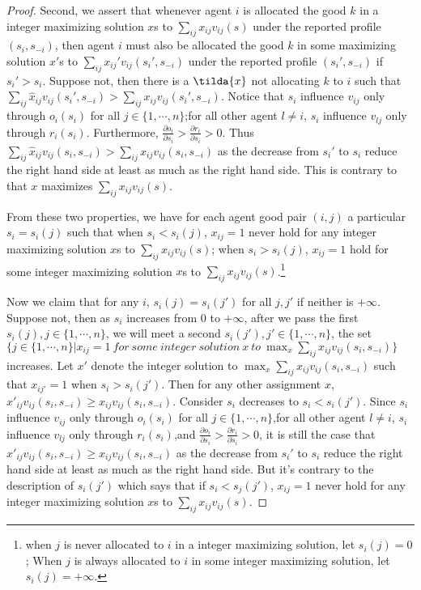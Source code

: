 \begin{proof}
 Second, we assert that whenever agent $i$ is allocated the good $k$ in a integer maximizing solution $x$s to  $\sum_{ij}x_{ij}v_{ij}(s)$ under the reported profile $(s_i,s_{-i})$, then agent $i$ must also be allocated the good $k$ in some maximizing solution $x'$s to  $\sum_{ij}x_{ij}'v_{ij}(s_i', s_{-i})$ under the reported profile $(s_i',s_{-i})$ if $s_i' > s_i$. Suppose not, then there is a $\tilda{x}$ not allocating $k$ to $i$ such that $\sum_{ij}\hat{x}_{ij}v_{ij}(s_i', s_{-i}) > \sum_{ij}x_{ij}v_{ij}(s_i',s_{-i})$. Notice that $s_i$ influence $v_{ij}$ only through $o_i(s_i)$ for all $j \in \{1,\cdots,n\}$;for all other agent $l \not = i$, $s_i$ influence $v_{lj}$ only through $r_i(s_i)$. Furthermore, $\frac{\partial o_i}{\partial s_i}> \frac{\partial r_i}{\partial s_i} > 0$. Thus $\sum_{ij}\hat{x}_{ij}v_{ij}(s_i, s_{-i}) > \sum_{ij}x_{ij}v_{ij}(s_i,s_{-i})$ as the decrease from $s_i'$ to $s_i$ reduce the right hand side at least as much as the right hand side. This is contrary to  that $x$ maximizes $\sum_{ij}x_{ij}v_{ij}(s)$.
 
 From these two properties, we have for each agent good pair $(i,j)$ a particular $s_i=s_i(j)$ such that when $s_i < s_i(j)$, $x_{ij}=1$ never hold for any integer maximizing solution $x$s to  $\sum_{ij}x_{ij}v_{ij}(s)$; when $s_i > s_i(j)$, $x_{ij}=1$ hold for some integer maximizing solution $x$s to  $\sum_{ij}x_{ij}v_{ij}(s)$.\footnote{when $j$ is never allocated to $i$ in a integer maximizing solution, let $s_i(j)=0$; When $j$ is always allocated to $i$ in some integer maximizing solution, let $s_i(j)=+\infty$.}

 Now we claim that for any $i$, $s_i(j)=s_i(j')$ for all $j, j'$ if neither is $+\infty$. Suppose not, then as $s_i$ increases from $0$ to $+\infty$, after we pass the first
 $s_i(j),j \in \{1,\cdots,n\}$, we will meet a second $s_i(j'), j' \in \{1,\cdots,n\}$, the set $\{j \in  \{1,\cdots,n\}| x_{ij}=1\ for\ some\ integer\ solution\ x\ to\ \max_x\sum_{ij}x_{ij}v_{ij}(s_i,s_{-i})\}$ increases. Let $x'$ denote the integer solution to $\max_x\sum_{ij}x_{ij}v_{ij}(s_i,s_{-i})$
 such that $x_{ij'}=1$ when $s_i > s_i(j')$. Then for any other assignment $x$, $x'_{ij}v_{ij}(s_i,s_{-i}) \geq x_{ij}v_{ij}(s_i,s_{-i})$. Consider $s_i$ decreases to  $s_i < s_i(j')$. Since  $s_i$ influence $v_{ij}$ only through $o_i(s_i)$ for all $j \in \{1,\cdots,n\}$,for all other agent $l \not = i$, $s_i$ influence $v_{lj}$ only through $r_i(s_i)$,and $\frac{\partial o_i}{\partial s_i}> \frac{\partial r_i}{\partial s_i} > 0$, it is still the case that $x'_{ij}v_{ij}(s_i,s_{-i}) \geq x_{ij}v_{ij}(s_i,s_{-i})$  as the decrease from $s_i'$ to $s_i$ reduce the right hand side at least as much as the right hand side. But it's contrary to the description of $s_i(j')$ which says that if $s_i < s_j(j')$,  $x_{ij}=1$ never hold for any integer maximizing solution $x$s to  $\sum_{ij}x_{ij}v_{ij}(s)$.


\end{proof}
